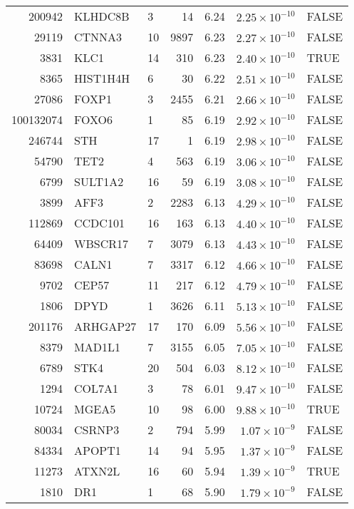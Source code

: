 \begin{table}[ht]
\begin{adjustbox}{totalheight=10in}
\begin{tabular}{rllrrrl}
  200942 & KLHDC8B & 3 &  14 & 6.24 & $2.25 \times 10^{-10}$ & FALSE \\ 
  29119 & CTNNA3 & 10 & 9897 & 6.23 & $2.27 \times 10^{-10}$ & FALSE \\ 
  3831 & KLC1 & 14 & 310 & 6.23 & $2.40 \times 10^{-10}$ & TRUE \\ 
  8365 & HIST1H4H & 6 &  30 & 6.22 & $2.51 \times 10^{-10}$ & FALSE \\ 
  27086 & FOXP1 & 3 & 2455 & 6.21 & $2.66 \times 10^{-10}$ & FALSE \\ 
  100132074 & FOXO6 & 1 &  85 & 6.19 & $2.92 \times 10^{-10}$ & FALSE \\ 
  246744 & STH & 17 &   1 & 6.19 & $2.98 \times 10^{-10}$ & FALSE \\ 
  54790 & TET2 & 4 & 563 & 6.19 & $3.06 \times 10^{-10}$ & FALSE \\ 
  6799 & SULT1A2 & 16 &  59 & 6.19 & $3.08 \times 10^{-10}$ & FALSE \\ 
  3899 & AFF3 & 2 & 2283 & 6.13 & $4.29 \times 10^{-10}$ & FALSE \\ 
  112869 & CCDC101 & 16 & 163 & 6.13 & $4.40 \times 10^{-10}$ & FALSE \\ 
  64409 & WBSCR17 & 7 & 3079 & 6.13 & $4.43 \times 10^{-10}$ & FALSE \\ 
  83698 & CALN1 & 7 & 3317 & 6.12 & $4.66 \times 10^{-10}$ & FALSE \\ 
  9702 & CEP57 & 11 & 217 & 6.12 & $4.79 \times 10^{-10}$ & FALSE \\ 
  1806 & DPYD & 1 & 3626 & 6.11 & $5.13 \times 10^{-10}$ & FALSE \\ 
  201176 & ARHGAP27 & 17 & 170 & 6.09 & $5.56 \times 10^{-10}$ & FALSE \\ 
  8379 & MAD1L1 & 7 & 3155 & 6.05 & $7.05 \times 10^{-10}$ & FALSE \\ 
  6789 & STK4 & 20 & 504 & 6.03 & $8.12 \times 10^{-10}$ & FALSE \\ 
  1294 & COL7A1 & 3 &  78 & 6.01 & $9.47 \times 10^{-10}$ & FALSE \\ 
  10724 & MGEA5 & 10 &  98 & 6.00 & $9.88 \times 10^{-10}$ & TRUE \\ 
  80034 & CSRNP3 & 2 & 794 & 5.99 & $1.07 \times 10^{-9}$ & FALSE \\ 
  84334 & APOPT1 & 14 &  94 & 5.95 & $1.37 \times 10^{-9}$ & FALSE \\ 
  11273 & ATXN2L & 16 &  60 & 5.94 & $1.39 \times 10^{-9}$ & TRUE \\ 
  1810 & DR1 & 1 &  68 & 5.90 & $1.79 \times 10^{-9}$ & FALSE \\ 

\end{tabular}
\end{adjustbox}
\end{table}
